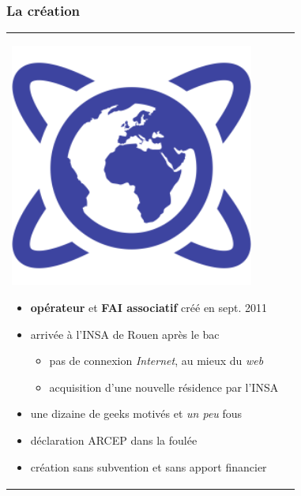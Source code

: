 \documentclass[handout]{beamer}
\begin{document}
		\begin{frame}
		\frametitle{La création}
		\begin{tabular}{l l}
			\begin{minipage}{0.2\textwidth}
				\begin{center}
					\includegraphics[width=0.9\textwidth]{images/internet.png}
				\end{center}
			\end{minipage}

			\begin{minipage}{0.8\textwidth}
				\begin{itemize}
					\item \textbf{opérateur} et \textbf{FAI associatif} créé en sept. 2011
					\item arrivée à l'INSA de Rouen après le bac
					\begin{itemize}
						\item pas de connexion \textit{Internet}, au mieux du \textit{web}
						\item acquisition d'une nouvelle résidence par l'INSA
					\end{itemize}
					\item une dizaine de geeks motivés et \textit{un peu} fous
					\item déclaration ARCEP dans la foulée
					\item création sans subvention et sans apport financier
				\end{itemize}
			\end{minipage}
			
		\end{tabular}
		\end{frame}
\end{document}
